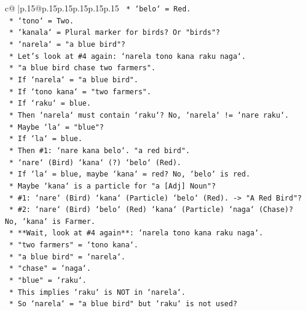 \documentclass{article}
\begin{document}
{\begin{supertabular}{c@{$\;$}|p{.15\linewidth}@{}p{.15\linewidth}p{.15\linewidth}p{.15\linewidth}p{.15\linewidth}p{.15\linewidth}}
{{{\texttt{        *   `belo` = Red.} \\
\texttt{        *   `tono` = Two.} \\
\texttt{        *   `kanala` = Plural marker for birds? Or "birds"?} \\
\texttt{        *   `narela` = "a blue bird"?} \\
\texttt{        *   Let's look at \#4 again: `narela tono kana raku naga`.} \\
\texttt{            *   "a blue bird chase two farmers".} \\
\texttt{            *   If `narela` = "a blue bird".} \\
\texttt{            *   If `tono kana` = "two farmers".} \\
\texttt{            *   If `raku` = blue.} \\
\texttt{            *   Then `narela` must contain `raku`? No, `narela` != `nare raku`.} \\
\texttt{            *   Maybe `la` = "blue"?} \\
\texttt{            *   If `la` = blue.} \\
\texttt{            *   Then \#1: `nare kana belo`. "a red bird".} \\
\texttt{                *   `nare` (Bird) `kana` (?) `belo` (Red).} \\
\texttt{                *   If `la` = blue, maybe `kana` = red? No, `belo` is red.} \\
\texttt{                *   Maybe `kana` is a particle for "a {[}Adj{]} Noun"?} \\
\texttt{                *   \#1: `nare` (Bird) `kana` (Particle) `belo` (Red). {-}> "A Red Bird"?} \\
\texttt{                *   \#2: `nare` (Bird) `belo` (Red) `kana` (Particle) `naga` (Chase)? No, `kana` is Farmer.} \\
\texttt{            *   **Wait, look at \#4 again**: `narela tono kana raku naga`.} \\
\texttt{                *   "two farmers" = `tono kana`.} \\
\texttt{                *   "a blue bird" = `narela`.} \\
\texttt{                *   "chase" = `naga`.} \\
\texttt{                *   "blue" = `raku`.} \\
\texttt{                *   This implies `raku` is NOT in `narela`.} \\
\texttt{                *   So `narela` = "a blue bird" but `raku` is not used?} \\
}}}
\end{supertabular}}
\end{document}
